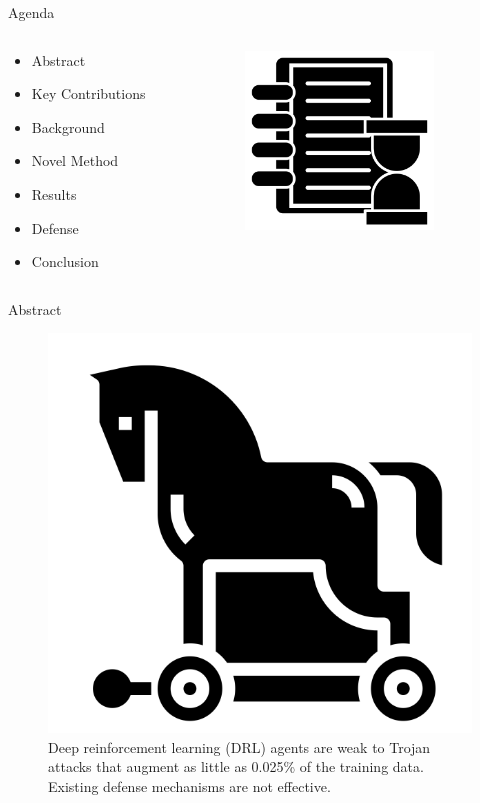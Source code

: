 \documentclass[pdf]{beamer}
\begin{document}
\begin{frame}[fragile]{Agenda}
\begin{minipage}[0.2\textheight]{\textwidth}
\begin{columns}[T]
\begin{column}{0.5\textwidth}
\begin{itemize}
\item Abstract
\item Key Contributions
\item Background
\item Novel Method
\item Results
\item Defense
\item Conclusion
\end{itemize}
\end{column}
\begin{column}{0.5\textwidth}
\includegraphics[width=5cm]{Images/agenda.png}
\end{column}
\end{columns}
\end{minipage}
\end{frame}




\begin{frame}[fragile]{Abstract}
\begin{figure}
\includegraphics[width=0.3\linewidth,keepaspectratio]{Images/trojan.png}
\caption{Deep reinforcement learning (DRL) agents are weak to Trojan attacks that augment as little as 0.025\% of the training data. Existing defense mechanisms are not effective.}
\end{figure}
\end{frame}
\end{document}
